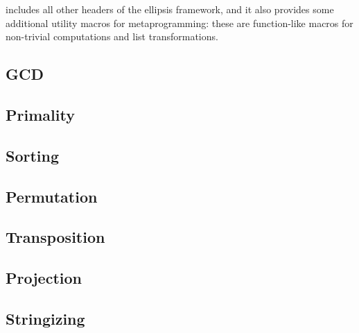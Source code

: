 \def\Subsection#1{\subsection{#1}}

 includes all other headers of the ellipsis framework, and
it also provides some additional utility macros for metaprogramming: these are
function-like macros for non-trivial computations and list transformations.

\Subsection{GCD}

\Subsection{Primality}

\Subsection{Sorting}

\Subsection{Permutation}

\Subsection{Transposition}

\Subsection{Projection}

\Subsection{Stringizing}
